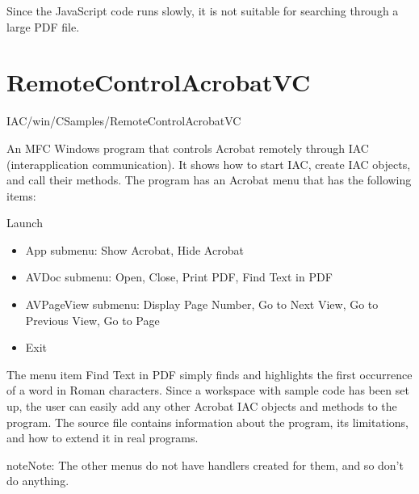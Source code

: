 \documentclass[letterpaper,12pt,english,openany,oneside]{sphinxmanual}
\begin{document}
\label{\detokenize{Samples_WindowsIAC:implementation-details-4}}

Since the JavaScript code runs slowly, it is not suitable for searching through a large PDF file.


\section{RemoteControlAcrobatVC}
\label{\detokenize{Samples_WindowsIAC:remotecontrolacrobatvc}}\label{\detokenize{Samples_WindowsIAC:location-20}}

IAC/win/CSamples/RemoteControlAcrobatVC

\label{\detokenize{Samples_WindowsIAC:description-20}}

An MFC Windows program that controls Acrobat remotely through IAC (interapplication communication). It shows how to start IAC, create IAC objects, and call their methods. The program has an Acrobat menu that has the following items:

Launch
\begin{itemize}
\item {} 
App submenu: Show Acrobat, Hide Acrobat

\item {} 
AVDoc submenu: Open, Close, Print PDF, Find Text in PDF

\item {} 
AVPageView submenu: Display Page Number, Go to Next View, Go to Previous View, Go to Page

\item {} 
Exit

\end{itemize}

The menu item Find Text in PDF simply finds and highlights the first occurrence of a word in Roman characters. Since a workspace with sample code has been set up, the user can easily add any other Acrobat IAC objects and methods to the program. The source file  contains information about the program, its limitations, and how to extend it in real programs.

\begin{sphinxadmonition}{note}{Note:}
The other menus do not have handlers created for them, and so don’t do anything.
\end{sphinxadmonition}
\end{document}
